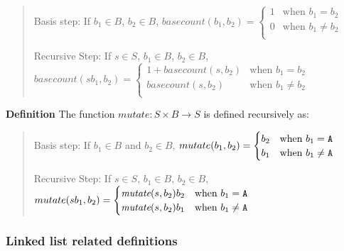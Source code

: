 \documentclass[12pt, oneside]{article}
\begin{document}
\begin{quote}
Basis step: If  $b_1 \in B$, $b_2 \in B$, $basecount(b_1, b_2) =
        \begin{cases}
            1 & \textrm{when } b_1 = b_2 \\
            0 & \textrm{when } b_1 \neq b_2 \\
        \end{cases}$

Recursive Step: If $s \in S$, $b_1 \in B$, $b_2 \in B$, $basecount(s b_1, b_2) =
        \begin{cases}
            1 + \textit{basecount}(s, b_2) & \textrm{when } b_1 = b_2 \\
            \textit{basecount}(s, b_2) & \textrm{when } b_1 \neq b_2 \\
        \end{cases}$
\end{quote}

{\bf Definition} The function $\textit{mutate} :  S \times B \to S$ is defined recursively as:

\begin{quote}
Basis step: If  $b_1 \in B$ and $b_2 \in B$, $mutate(b_1, b_2) =
        \begin{cases}
            b_2 & \textrm{when } b_1 = \texttt{A} \\
            b_1 & \textrm{when } b_1 \neq \texttt{A} \\
        \end{cases}$

Recursive Step: If $s \in S$, $b_1 \in B$, $b_2 \in B$, $mutate(sb_1, b_2) =
        \begin{cases}
            \textit{mutate}(s, b_2)b_2 & \textrm{when } b_1 = \texttt{A} \\
            \textit{mutate}(s, b_2)b_1 & \textrm{when } b_1 \neq \texttt{A} \\
        \end{cases}$
\end{quote}

\newpage
\subsubsection*{Linked list related definitions}
\end{document}
